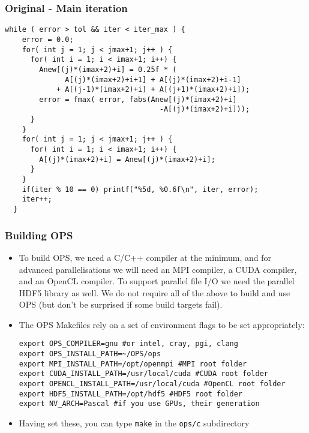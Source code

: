 \documentclass{beamer}
\begin{document}
\begin{frame}[fragile]
\frametitle{Original - Main iteration}

\begin{lstlisting}
while ( error > tol && iter < iter_max ) {
    error = 0.0;
    for( int j = 1; j < jmax+1; j++ ) {
      for( int i = 1; i < imax+1; i++) {
        Anew[(j)*(imax+2)+i] = 0.25f * (
              A[(j)*(imax+2)+i+1] + A[(j)*(imax+2)+i-1]
            + A[(j-1)*(imax+2)+i] + A[(j+1)*(imax+2)+i]);
        error = fmax( error, fabs(Anew[(j)*(imax+2)+i]
                                    -A[(j)*(imax+2)+i]));
      }
    }
    for( int j = 1; j < jmax+1; j++ ) {
      for( int i = 1; i < imax+1; i++) {
        A[(j)*(imax+2)+i] = Anew[(j)*(imax+2)+i];
      }
    }
    if(iter % 10 == 0) printf("%5d, %0.6f\n", iter, error);
    iter++;
  }
    \end{lstlisting}
\end{frame}

\begin{frame}[fragile]
\frametitle{Building OPS}
\fontsize{11}{12}\selectfont
\begin{itemize}
\item To build OPS, we need a C/C++ compiler at the minimum, and for advanced parallelisations we will need an MPI compiler, a CUDA compiler, and an OpenCL compiler. To support parallel file I/O we need the parallel HDF5 library as well. We do not require all of the above to build and use OPS (but don't be surprised if some build targets fail).
\item The OPS Makefiles rely on a set of environment flags to be set appropriately:
\begin{lstlisting}[basicstyle=\tiny]
export OPS_COMPILER=gnu #or intel, cray, pgi, clang
export OPS_INSTALL_PATH=~/OPS/ops
export MPI_INSTALL_PATH=/opt/openmpi #MPI root folder
export CUDA_INSTALL_PATH=/usr/local/cuda #CUDA root folder
export OPENCL_INSTALL_PATH=/usr/local/cuda #OpenCL root folder
export HDF5_INSTALL_PATH=/opt/hdf5 #HDF5 root folder
export NV_ARCH=Pascal #if you use GPUs, their generation
\end{lstlisting}
\item Having set these, you can type \texttt{make} in the \texttt{ops/c} subdirectory
\end{itemize}
\end{frame}
\end{document}
